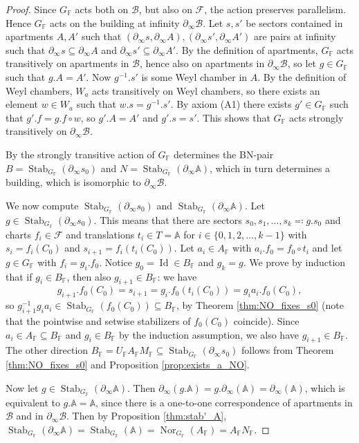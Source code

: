 \documentclass[12pt]{amsart}
\newcommand{\F}{\mathbb{F} }
\newcommand{\fraka}{\mathfrak{a}}
\newcommand{\A}{\mathbb{A}}
\newcommand{\Fun}{\mathscr{F}} %
\newcommand{\B}{\mathcal{B}}
\newcommand{\Id}{\operatorname{Id} }
\numberwithin{equation}{section}
\theoremstyle{remark} %
\begin{document}
\begin{proof}
	Since $G_\F$ acts both on $\B$, but also on $\Fun$, the action preserves parallelism. Hence $G_\F$ acts on the building at infinity $\partial_\infty\B$. Let $s,s'$ be sectors contained in apartments $A,A'$ such that $( \partial_\infty s, \partial_\infty A), ( \partial_\infty s', \partial_\infty A') $ are pairs at infinity such that $ \partial_\infty s \subseteq  \partial_\infty A$ and $ \partial_\infty s' \subseteq  \partial_\infty A'$. 
	By the definition of apartments, $G_\F$ acts transitively on apartments in $\B$, hence also on apartments in $\partial_\infty \B$, so let $g\in G_\F$ such that $g.A = A'$. Now $g^{-1}.s'$ is some Weyl chamber in $A$. By the definition of Weyl chambers, $W_a$ acts transitively on Weyl chambers, so there exists an element $w\in W_a$ such that $w.s = g^{-1}.s'$. By axiom (A1) there exists $g' \in G_\F$ such that $g'.f = g.f \circ w$, so $g'.A = A'$ and $g'.s = s'$. This shows that $G_\F$ acts strongly transitively on $\partial_\infty \B$.
	
	By \cite[(5.2), (5.3) and Remark 2]{Ron} the strongly transitive action of $G_\F$ determines the BN-pair $B= \operatorname{Stab}_{G_\F}(\partial_\infty s_0)$ and $N=\operatorname{Stab}_{G_\F}(\partial_\infty \mathbb{A})$, which in turn determines a building, which is isomorphic to $\partial_\infty \B$. 
	
	We now compute $\operatorname{Stab}_{G_\F}(\partial_\infty s_0)$ and $\operatorname{Stab}_{G_\F}(\partial_\infty \A)$. Let $g\in \operatorname{Stab}_{G_\F}(\partial_\infty s_0)$. This means that there are sectors $s_0, s_1, \ldots, s_k \eqqcolon g.s_0$ and charts $f_i \in \Fun$ and translations $t_i\in T=\A$ for $i\in \{0,1, 2, \ldots , k-1\}$ with $s_i=f_i(C_0)$ and $s_{i+1} = f_i(t_i(C_0))$. Let $a_i\in A_\F$ with $a_i.f_0 = f_0\circ t_i$ and let $g\in G_\F$ with $f_i = g_i.f_0$. Notice $g_0=\Id \in B_\F$ and $g_k = g$. We prove by induction that if $g_i\in B_\F$, then also $g_{i+1}\in B_\F$: we have
	$$
	g_{i+1}.f_0(C_0) = s_{i+1} = g_i.f_0(t_i(C_0)) = g_i a_i .f_0(C_0),
	$$
	so $g_{i+1}^{-1} g_i a_i \in \operatorname{Stab}_{G_\F}(f_0(C_0)) \subseteq B_\F$, by Theorem \ref{thm:NO_fixes_s0} (note that the pointwise and setwise stabilizers of $f_0(C_0)$ coincide). %
	Since $a_i \in A_\F \subseteq B_\F$ and $g_i\in B_\F$ by the induction assumption, we also have $g_{i+1} \in B_\F$.
	The other direction $B_\F = U_\F A_\F M_\F \subseteq \operatorname{Stab}_{G_\F}(\partial_\infty s_0)$ follows from Theorem \ref{thm:NO_fixes_s0} and Proposition \ref{prop:exists_a_NO}. 

Now let $g\in \operatorname{Stab}_{G_\F}(\partial_\infty \A)$. Then $\partial_\infty(g.\A) = g.\partial_\infty(\A) = \partial_\infty (\A)$, which is equivalent to $g.\A = \A$, since there is a one-to-one correspondence of apartments in $\B$ and in $\partial_\infty \B$. Then by Proposition \ref{thm:stab'_A},  $\operatorname{Stab}_{G_\F}(\partial_\infty \A) = \operatorname{Stab}_{G_\F}(\A) = \operatorname{Nor}_{G_\F}(A_\F) = A_\F N_\F$. 
\end{proof}
\end{document}
